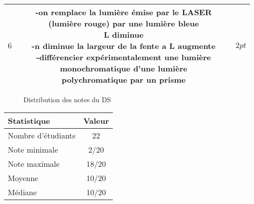 \documentclass[12pt]{article}
\begin{document}
\begin{center}
\begin{tabular}{|c||c||c|}
 $6$ &
 \makecell{-on remplace la lumière émise par le LASER (lumière rouge) par une lumière bleue\\L diminue\\
	 -n diminue la largeur de la fente a L augmente\\
	 -différencier expérimentalement une lumière monochromatique d’une lumière \\ polychromatique  par un prisme
}
 & $2pt$\\\hline











  \end{tabular}
  \end{center}



\begin{figure}[h]
    \centering
    \caption{Distribution des notes du DS}
\end{figure}

\begin{center}
    \begin{tabular}{|l|c|}
        \hline
        \textbf{Statistique} & \textbf{Valeur} \\
        \hline
        Nombre d'étudiants & 22 \\
        Note minimale & 2/20 \\
        Note maximale & 18/20 \\
        Moyenne & 10/20 \\
        Médiane & 10/20 \\
        \hline
    \end{tabular}
\end{center}
\end{document}
